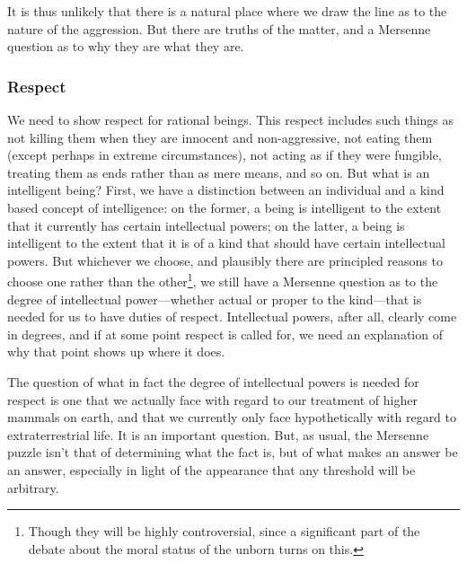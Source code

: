 It is thus unlikely that there is a natural place where we draw the line as to the nature of the aggression. But there are
truths of the matter, and a Mersenne question as to why they are what they are.

\subsubsection{Respect}
We need to show respect for rational beings. This respect includes such things as not killing them when they are
innocent and non-aggressive, not eating them (except perhaps in extreme circumstances), not acting as if they were fungible, treating them as ends rather than as
mere means, and so on. But what is an intelligent being? First, we have a distinction between an individual and a kind based
concept of intelligence: on the former, a being is intelligent to the extent that it currently has certain intellectual powers;
on the latter, a being is intelligent to the extent that it is of a kind that should have certain intellectual powers. But whichever we choose, and
plausibly there are principled reasons to choose one rather than the other\footnote{Though they will be highly controversial, since 
a significant part of the debate about the moral status of the unborn turns on this.}, 
we still have a Mersenne question as to the degree of intellectual power---whether actual or proper to the kind---that is 
needed for us to have duties of respect. Intellectual powers, after all, clearly come in degrees, and if at some point respect
is called for, we need an explanation of why that point shows up where it does.

The question of what in fact the degree of intellectual powers is needed for respect is one that we actually face with regard to our treatment
of higher mammals on earth, and that we currently only face hypothetically with regard to extraterrestrial life. 
It is an important question. But, as usual, the Mersenne puzzle isn't that of determining what the fact is, but of what makes 
an answer be an answer, especially in light of the appearance that any threshold will be arbitrary.

